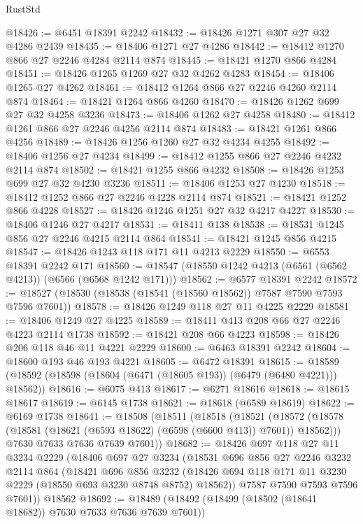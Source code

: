 \begin{lexlean}{RustStd}
\begin{coremodule}
{\begin{coremodule}
{{{{{{{{{{{{{{{{{{{{{{{{{{@18426 := @6451 @18391 @2242
@18432 := @18426 @1271 @307 @27 @32 @4286 @2439
@18435 := @18406 @1271 @27 @4286
@18442 := @18412 @1270 @866 @27 @2246 @4284 @2114 @874
@18445 := @18421 @1270 @866 @4284
@18451 := @18426 @1265 @1269 @27 @32 @4262 @4283
@18454 := @18406 @1265 @27 @4262
@18461 := @18412 @1264 @866 @27 @2246 @4260 @2114 @874
@18464 := @18421 @1264 @866 @4260
@18470 := @18426 @1262 @699 @27 @32 @4258 @3236
@18473 := @18406 @1262 @27 @4258
@18480 := @18412 @1261 @866 @27 @2246 @4256 @2114 @874
@18483 := @18421 @1261 @866 @4256
@18489 := @18426 @1256 @1260 @27 @32 @4234 @4255
@18492 := @18406 @1256 @27 @4234
@18499 := @18412 @1255 @866 @27 @2246 @4232 @2114 @874
@18502 := @18421 @1255 @866 @4232
@18508 := @18426 @1253 @699 @27 @32 @4230 @3236
@18511 := @18406 @1253 @27 @4230
@18518 := @18412 @1252 @866 @27 @2246 @4228 @2114 @874
@18521 := @18421 @1252 @866 @4228
@18527 := @18426 @1246 @1251 @27 @32 @4217 @4227
@18530 := @18406 @1246 @27 @4217
@18531 := @18411 @138
@18538 := @18531 @1245 @856 @27 @2246 @4215 @2114 @864
@18541 := @18421 @1245 @856 @4215
@18547 := @18426 @1243 @118 @171 @11 @4213 @2229
@18550 := @6553 @18391 @2242 @171
@18560 := @18547 (@18550 @1242 @4213 (@6561 (@6562 @4213)) (@6566 (@6568 @1242 @171)))
@18562 := @6577 @18391 @2242
@18572 := @18527 (@18530 (@18538 (@18541 (@18560 @18562)) @7587 @7590 @7593 @7596 @7601))
@18578 := @18426 @1249 @118 @27 @11 @4225 @2229
@18581 := @18406 @1249 @27 @4225
@18589 := @18411 @413 @208 @66 @27 @2246 @4223 @2114 @1738
@18592 := @18421 @208 @66 @4223
@18598 := @18426 @206 @118 @46 @11 @4221 @2229
@18600 := @6463 @18391 @2242
@18604 := @18600 @193 @46 @193 @4221
@18605 := @6472 @18391
@18615 := @18589 (@18592 (@18598 (@18604 (@6471 (@18605 @193)) (@6479 (@6480 @4221))) @18562))
@18616 := @6075 @413
@18617 := @6271 @18616
@18618 := @18615 @18617
@18619 := @6145 @1738
@18621 := @18618 (@6589 @18619)
@18622 := @6169 @1738
@18641 := @18508
    (@18511
      (@18518
        (@18521
          (@18572 (@18578 (@18581 (@18621 (@6593 @18622) (@6598 (@6600 @413)) @7601)) @18562)))
        @7630
        @7633
        @7636
        @7639
        @7601))
@18682 := @18426
    @697
    @118
    @27
    @11
    @3234
    @2229
    (@18406
      @697
      @27
      @3234
      (@18531
        @696
        @856
        @27
        @2246
        @3232
        @2114
        @864
        (@18421
          @696
          @856
          @3232
          (@18426 @694 @118 @171 @11 @3230 @2229 (@18550 @693 @3230 @8748 @8752) @18562))
        @7587
        @7590
        @7593
        @7596
        @7601))
    @18562
@18692 := @18489 (@18492 (@18499 (@18502 (@18641 @18682)) @7630 @7633 @7636 @7639 @7601))
}}}}}}}}}}}}}}}}}}}}}}}}}}
\end{coremodule}}
\end{coremodule}
\end{lexlean}
